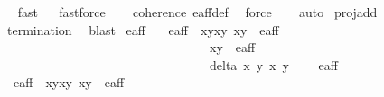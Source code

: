 \begin{isabellebody}
%
\isadelimproof
\ \ %
\endisadelimproof
%
\isatagproof
{}\isamarkupfalse%
{\isacharparenleft}fast{\isacharparenright}\isanewline
\ \ \isamarkupfalse%
{\isacharparenleft}fastforce{\isacharparenright}\isanewline
\ \ \isamarkupfalse%
\ coherence\ e{\isacharprime}{\isacharunderscore}aff{\isacharunderscore}def\ \isamarkupfalse%
\ force\isanewline
\ \ \isamarkupfalse%
\ auto%
\endisatagproof
{\isafoldproof}%
%
\isadelimproof
\isanewline
%
\endisadelimproof
\isanewline
{}\isamarkupfalse%
\ proj{\isacharunderscore}add%
\isadelimproof
\ %
\endisadelimproof
%
\isatagproof
{}\isamarkupfalse%
\ {\isachardoublequoteopen}termination{\isachardoublequoteclose}\ \isamarkupfalse%
\ blast%
\endisatagproof
{\isafoldproof}%
%
\isadelimproof
%
\endisadelimproof
\isanewline
\isanewline
{}\isamarkupfalse%
\ e{\isacharprime}{\isacharunderscore}aff{\isacharunderscore}{}\ \isanewline
\ \ {\isachardoublequoteopen}e{\isacharprime}{\isacharunderscore}aff{\isacharunderscore}{}\ {\isacharequal}\ {\isacharbraceleft}{\isacharparenleft}{\isacharparenleft}x{}{\isacharcomma}y{}{\isacharparenright}{\isacharcomma}{\isacharparenleft}x{}{\isacharcomma}y{}{\isacharparenright}{\isacharparenright}{\isachardot}\ {\isacharparenleft}x{}{\isacharcomma}y{}{\isacharparenright}\ {\isasymin}\ e{\isacharprime}{\isacharunderscore}aff\ {\isasymand}\ \isanewline
\ \ \ \ \ \ \ \ \ \ \ \ \ \ \ \ \ \ \ \ \ \ \ \ \ \ \ \ \ \ \ \ \ {\isacharparenleft}x{}{\isacharcomma}y{}{\isacharparenright}\ {\isasymin}\ e{\isacharprime}{\isacharunderscore}aff\ {\isasymand}\ \isanewline
\ \ \ \ \ \ \ \ \ \ \ \ \ \ \ \ \ \ \ \ \ \ \ \ \ \ \ \ \ \ \ \ \ delta\ x{}\ y{}\ x{}\ y{}\ {\isasymnoteq}\ {}\ {\isacharbraceright}{\isachardoublequoteclose}\isanewline
\isanewline
{}\isamarkupfalse%
\ e{\isacharprime}{\isacharunderscore}aff{\isacharunderscore}{}\ \isanewline
\ \ {\isachardoublequoteopen}e{\isacharprime}{\isacharunderscore}aff{\isacharunderscore}{}\ {\isacharequal}\ {\isacharbraceleft}{\isacharparenleft}{\isacharparenleft}x{}{\isacharcomma}y{}{\isacharparenright}{\isacharcomma}{\isacharparenleft}x{}{\isacharcomma}y{}{\isacharparenright}{\isacharparenright}{\isachardot}\ {\isacharparenleft}x{}{\isacharcomma}y{}{\isacharparenright}\ {\isasymin}\ e{\isacharprime}{\isacharunderscore}aff\ {\isasymand}\ \isanewline

\end{isabellebody}
